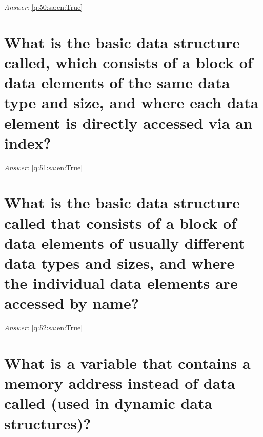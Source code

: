 \documentclass[a4paper,11pt,oneside]{book}
\begin{document}
\begin{sloppypar}
\label{q:50:sa:en:False}

\vspace{2cm}

\noindent\makebox[\textwidth]{\hrulefill}

\vspace{1cm}

\textit{Answer}: \autoref{q:50:sa:en:True}



\section{What is the basic data structure called, which consists of a block of data elements of the same data type and size, and where each data element is directly accessed via an index?}

\label{q:51:sa:en:False}

\vspace{2cm}

\noindent\makebox[\textwidth]{\hrulefill}

\vspace{1cm}

\textit{Answer}: \autoref{q:51:sa:en:True}



\section{What is the basic data structure called that consists of a block of data elements of usually different data types and sizes, and where the individual data elements are accessed by name?}

\label{q:52:sa:en:False}

\vspace{2cm}

\noindent\makebox[\textwidth]{\hrulefill}

\vspace{1cm}

\textit{Answer}: \autoref{q:52:sa:en:True}



\section{What is a variable that contains a memory address instead of data called (used in dynamic data structures)?}

\label{q:53:sa:en:False}

\vspace{2cm}


\end{sloppypar}
\end{document}
